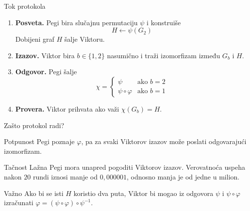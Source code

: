 ﻿\documentclass[aspectratio=1610]{beamer}
\newcommand{\keyword}[1]{\textcolor{wcprimary}{\textbf{#1}}}
\begin{document}
\begin{frame}{Tok protokola}
\begin{enumerate}
  \setlength{\itemsep}{10pt}
  \item \keyword{Posveta.} Pegi bira slučajnu permutaciju $\psi$ i konstruiše
  \[ H \leftarrow \psi(G_2) \]
  Dobijeni graf $H$ šalje Viktoru.

  \item \keyword{Izazov.} Viktor bira $b \in \{1, 2\}$ nasumično i traži
  izomorfizam između $G_b$ i $H$.

  \item \keyword{Odgovor.} Pegi šalje
  \[
    \chi = \begin{cases} \psi & \text{ako } b = 2 \\ \psi \circ \varphi & \text{ako } b = 1 \end{cases}
  \]

  \item \keyword{Provera.} Viktor prihvata ako važi $\chi(G_b) = H$.
\end{enumerate}
\end{frame}

\begin{frame}{Zašto protokol radi?}
\vspace{-4pt}

\begin{block}{Potpunost}
  Pegi poznaje $\varphi$, pa za svaki Viktorov izazov može poslati
  odgovarajući izomorfizam.
\end{block}

\vspace{-3pt}

\begin{alertblock}{Tačnost}
  Lažna Pegi mora unapred pogoditi Viktorov izazov.
  Verovatnoća uspeha nakon $20$ rundi iznosi manje od
  $0{,}000001$, odnosno manja je od jedne u milion.
\end{alertblock}

\vspace{-3pt}

\begin{exampleblock}{Važno}
  Ako bi se isti $H$ koristio dva puta, Viktor bi mogao iz odgovora
  $\psi$ i $\psi \circ \varphi$ izračunati
  $\varphi = (\psi \circ \varphi)\circ\psi^{-1}$.
\end{exampleblock}

\end{frame}
\end{document}
